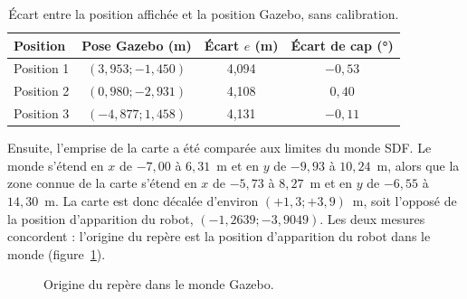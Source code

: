 \begin{table}[htbp]
\centering\small
\begin{tabular}{@{}lccc@{}}
\toprule
\textbf{Position} & \textbf{Pose Gazebo (m)} & \textbf{Écart $e$ (m)} & \textbf{Écart de cap (°)} \\
\midrule
Position 1 & $(3{,}953 ; -1{,}450)$ & 4,094 & $-0{,}53$ \\
Position 2 & $(0{,}980 ; -2{,}931)$ & 4,108 & $0{,}40$ \\
Position 3 & $(-4{,}877 ; 1{,}458)$ & 4,131 & $-0{,}11$ \\
\bottomrule
\end{tabular}
\caption{Écart entre la position affichée et la position Gazebo, sans calibration.}
\label{tab:avant}
\end{table}

Ensuite, l'emprise de la carte  a été comparée aux limites
du monde SDF. Le monde s'étend en $x$ de $-7{,}00$ à $6{,}31$~m et en $y$ de $-9{,}93$ à
$10{,}24$~m, alors que la zone connue de la carte s'étend en $x$ de $-5{,}73$ à $8{,}27$~m et
en $y$ de $-6{,}55$ à $14{,}30$~m. La carte est donc décalée d'environ $(+1{,}3 ; +3{,}9)$~m,
soit l'opposé de la position d'apparition du robot, $(-1{,}2639 ; -3{,}9049)$. Les deux
mesures concordent : l'origine du repère  est la position d'apparition du robot
dans le monde (figure~\ref{fig:reperes}).

\begin{figure}[htbp]
\centering
{}
\caption{Origine du repère  dans le monde Gazebo.}
\label{fig:reperes}
\end{figure}

